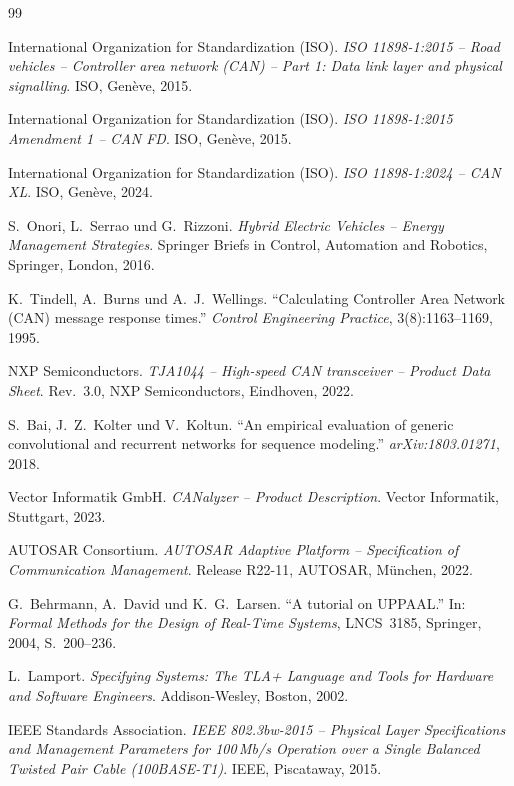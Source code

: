 ﻿\documentclass[a4paper,12pt]{article}
\theoremstyle{definition}
\begin{document}
\renewcommand{\refname}{Literaturverzeichnis}
\begin{thebibliography}{99}

International Organization for Standardization (ISO).
\emph{ISO 11898-1:2015 -- Road vehicles -- Controller area network (CAN) --
Part 1: Data link layer and physical signalling}.
ISO, Gen\`{e}ve, 2015.

International Organization for Standardization (ISO).
\emph{ISO 11898-1:2015 Amendment 1 -- CAN FD}.
ISO, Gen\`{e}ve, 2015.

International Organization for Standardization (ISO).
\emph{ISO 11898-1:2024 -- CAN XL}.
ISO, Gen\`{e}ve, 2024.

S.~Onori, L.~Serrao und G.~Rizzoni.
\emph{Hybrid Electric Vehicles -- Energy Management Strategies}.
Springer Briefs in Control, Automation and Robotics, Springer, London, 2016.

K.~Tindell, A.~Burns und A.~J.~Wellings.
``Calculating Controller Area Network (CAN) message response times.''
\emph{Control Engineering Practice}, 3(8):1163--1169, 1995.

NXP Semiconductors.
\emph{TJA1044 -- High-speed CAN transceiver -- Product Data Sheet}.
Rev.\ 3.0, NXP Semiconductors, Eindhoven, 2022.

S.~Bai, J.~Z.~Kolter und V.~Koltun.
``An empirical evaluation of generic convolutional and recurrent networks for
sequence modeling.''
\emph{arXiv:1803.01271}, 2018.

Vector Informatik GmbH.
\emph{CANalyzer -- Product Description}.
Vector Informatik, Stuttgart, 2023.

AUTOSAR Consortium.
\emph{AUTOSAR Adaptive Platform -- Specification of Communication Management}.
Release R22-11, AUTOSAR, M\"{u}nchen, 2022.

G.~Behrmann, A.~David und K.~G.~Larsen.
``A tutorial on UPPAAL.''
In: \emph{Formal Methods for the Design of Real-Time Systems}, LNCS~3185,
Springer, 2004, S.~200--236.

L.~Lamport.
\emph{Specifying Systems: The TLA+ Language and Tools for Hardware and Software
Engineers}.
Addison-Wesley, Boston, 2002.

IEEE Standards Association.
\emph{IEEE 802.3bw-2015 -- Physical Layer Specifications and Management Parameters
for 100\,Mb/s Operation over a Single Balanced Twisted Pair Cable (100BASE-T1)}.
IEEE, Piscataway, 2015.


\end{thebibliography}
\end{document}

